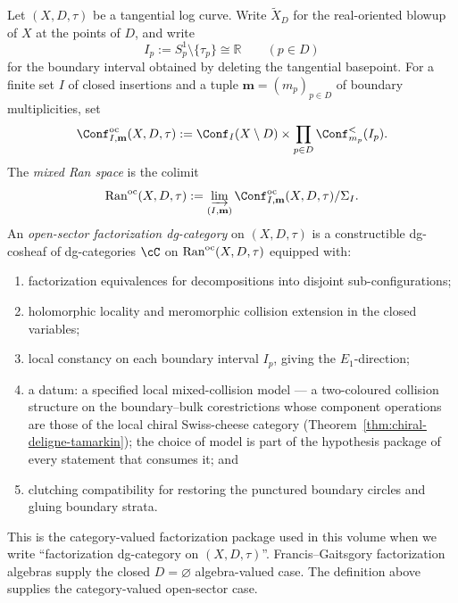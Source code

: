 \begin{definition}
\label{def:mr-mixed-ran-factorization-category}
Let \((X,D,\tau)\) be a tangential log curve.  Write
\(\widetilde X_D\) for the real-oriented blowup of \(X\) at the points
of \(D\), and write
\[
 I_p:=S^1_p\setminus\{\tau_p\}\cong\mathbb R
 \qquad (p\in D)
\]
for the boundary interval obtained by deleting the tangential
basepoint.  For a finite set \(I\) of closed insertions and a tuple
\(\mathbf m=(m_p)_{p\in D}\) of boundary multiplicities, set
\[
\Conf^{\mathrm{oc}}_{I,\mathbf m}(X,D,\tau)
:=
\Conf_I(X\setminus D)
\times
\prod_{p\in D}\Conf^{<}_{m_p}(I_p).
\]
The \emph{mixed Ran space} is the colimit
\[
\Ran^{\mathrm{oc}}(X,D,\tau)
:=
\varinjlim_{(I,\mathbf m)}
\Conf^{\mathrm{oc}}_{I,\mathbf m}(X,D,\tau)/\Sigma_I .
\]
An \emph{open-sector factorization dg-category} on
\((X,D,\tau)\) is a constructible dg-cosheaf of dg-categories
\(\cC\) on \(\mathrm{Ran}^{\mathrm{oc}}(X,D,\tau)\) equipped with:
\begin{enumerate}[label=\textup{(\roman*)}]
\item factorization equivalences for decompositions into disjoint
sub-configurations;
\item holomorphic locality and meromorphic collision extension in the
closed variables;
\item local constancy on each boundary interval \(I_p\), giving the
\(E_1\)-direction;
\item a datum: a specified local mixed-collision model --- a
two-coloured collision structure on the boundary--bulk corestrictions
whose component operations are those of the local chiral Swiss-cheese
category (Theorem~\ref{thm:chiral-deligne-tamarkin}); the choice of
model is part of the hypothesis package of every statement that
consumes it; and
\item clutching compatibility for restoring the punctured boundary
circles and gluing boundary strata.
\end{enumerate}
This is the category-valued factorization package used in this
volume when we write ``factorization dg-category on \((X,D,\tau)\)''.
Francis--Gaitsgory factorization algebras supply the closed
\(D=\varnothing\) algebra-valued case.  The definition above supplies
the category-valued open-sector case.
\end{definition}

